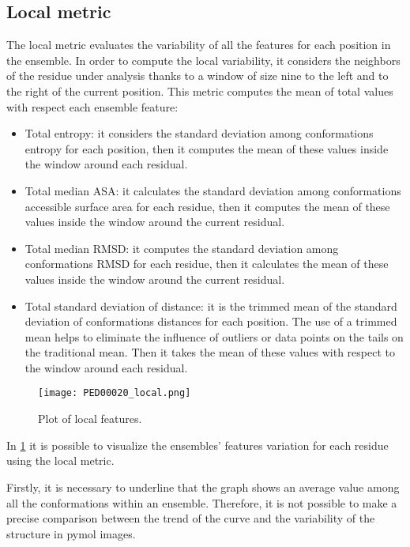 \subsection{Local metric}
The local metric evaluates the variability of all the features for each position in the ensemble.
In order to compute the local variability, it considers the neighbors of the residue under analysis thanks to a window of size nine to the left and to the right of the current position.
This metric computes the mean of total values with respect each ensemble feature: 

\begin{itemize}
\item Total entropy: it considers the standard deviation among conformations entropy for each position, then it computes the mean of these values inside the window around each residual.
\item Total median ASA: it calculates the standard deviation among conformations accessible surface area for each residue, then it computes the mean of these values inside the window around the current residual.
\item Total median RMSD: it computes the standard deviation among conformations RMSD for each residue, then it calculates the mean of these values inside the window around the current residual.
\item Total standard deviation of distance: it is the trimmed mean of the standard deviation of conformations distances for each position. 
The use of a trimmed mean helps to eliminate the influence of outliers or data points on the tails on the traditional mean. Then it takes the mean of these values with respect to the window around each residual.
\end{itemize}

\begin{figure}[H]
	\begin{minipage}[b]{0.97\textwidth}
		\centering
		\texttt{[image: PED00020\_local.png]}
		\caption{Plot of local features.}
		\label{plot}
	\end{minipage}	
\end{figure}

In \ref{plot} it is possible to visualize the ensembles' features variation for each residue using the local metric. 

\medskip
Firstly, it is necessary to underline that the graph shows an average value among all the conformations within an ensemble. Therefore, it is not possible to make a precise comparison between the trend of the curve and the variability of the structure in pymol images. 

